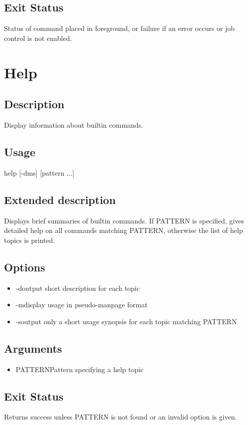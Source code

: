 \documentclass[12pt,a4paper]{report}
\begin{document}
\section{Exit Status}
Status of command placed in foreground, or failure if an error occurs or job control is not enabled.
\newpage

\chapter{Help}
\section{Description}
Display information about builtin commands.
\section{Usage}
help [-dms] [pattern ...]
\section{Extended description}
Displays brief summaries of builtin commands.  If PATTERN is specified, gives detailed help on all commands matching PATTERN, otherwise the list of help topics is printed.
\section{Options}
\begin{itemize}
	\item -d\hspace{7 mm}output short description for each topic
	\item -m\hspace{7 mm}display usage in pseudo-manpage format
	\item -s\hspace{7 mm}output only a short usage synopsis for each topic matching PATTERN
\end{itemize}
\section{Arguments}
\begin{itemize}
	\item PATTERN\hspace{7 mm}Pattern specifying a help topic
\end{itemize}
\section{Exit Status}
Returns success unless PATTERN is not found or an invalid option is given.
\newpage
\end{document}
